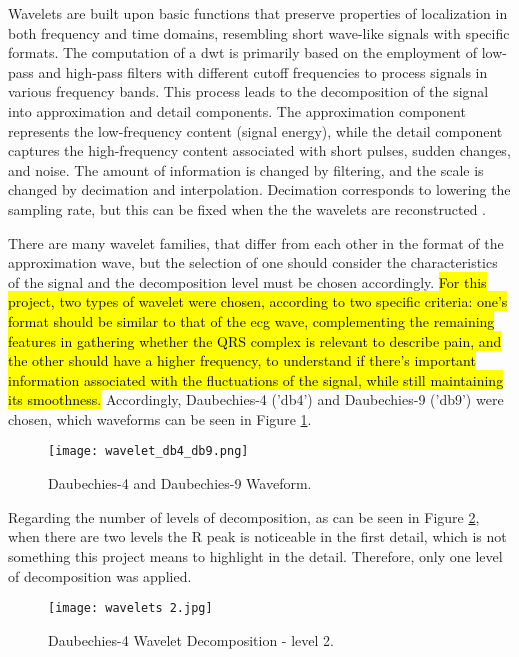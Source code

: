 Wavelets are built upon basic functions that preserve properties of localization in both frequency and time domains, resembling short wave-like signals with specific formats. The computation of a \ac{dwt} is primarily based on the employment of low-pass and high-pass filters with different cutoff frequencies to process signals in various frequency bands. This process leads to the decomposition of the signal into approximation and detail components. The approximation component represents the low-frequency content (signal energy), while the detail component captures the high-frequency content associated with short pulses, sudden changes, and noise. The amount of information is changed by filtering, and the scale is changed by decimation and interpolation. Decimation corresponds to lowering the sampling rate, but this can be fixed when the the wavelets are reconstructed \cite{Osadchiy2021}. 

There are many wavelet families, that differ from each other in the format of the approximation wave, but the selection of one should consider the characteristics of the signal and the decomposition level must be chosen accordingly. \hl{For this project, two types of wavelet were chosen, according to two specific criteria: one's format should be similar to that of the \ac{ecg} wave, complementing the remaining features in gathering whether the QRS complex is relevant to describe pain, and the other should have a higher frequency, to understand if there's important information associated with the fluctuations of the signal, while still maintaining its smoothness.}
Accordingly, Daubechies-4 ('db4') and Daubechies-9 ('db9') were chosen, which waveforms can be seen in Figure \ref{fig:waveform}. 

\begin{figure}[h!]
    \centering
    \texttt{[image: wavelet\_db4\_db9.png]}
    \caption{Daubechies-4 and Daubechies-9 Waveform.}
    \label{fig:waveform}
\end{figure}



Regarding the number of levels of decomposition, as can be seen in Figure \ref{fig:wavelets2}, when there are two levels the R peak is noticeable in the first detail, which is not something this project means to highlight in the detail.
Therefore, only one level of decomposition was applied.

\begin{figure}[h!]
    \centering
    \texttt{[image: wavelets 2.jpg]}
    \caption{Daubechies-4 Wavelet Decomposition - level 2.}
    \label{fig:wavelets2}
\end{figure}


